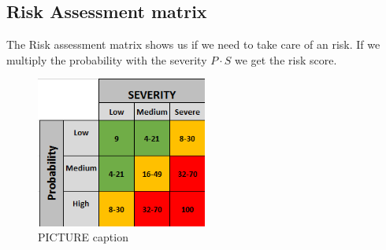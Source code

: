 \subsection{Risk Assessment matrix}
The Risk assessment matrix shows us if we need to take care of an risk. If we multiply the probability with the severity  $P\cdot S$ we get the risk score.
\begin{figure}[h]
        \centering
            \includegraphics[width = 0.5\textwidth]{VAPIQ-PICTURES/RiskAssesMentMatrix.png}
            \caption{PICTURE caption}
            \label{fig:testpic2}
        \hfill
\end{figure}